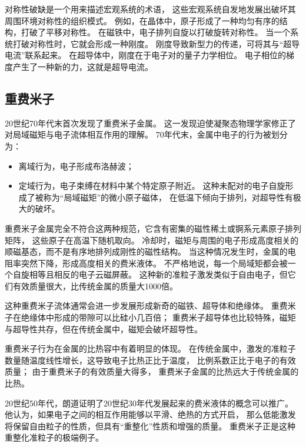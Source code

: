 \documentclass{article}
\begin{document}
对称性破缺是一个用来描述宏观系统的术语，
这些宏观系统自发地发展出破坏其周围环境对称性的组织模式。
例如，在晶体中，原子形成了一种均匀有序的结构，打破了平移对称性。
在磁铁中，电子排列自旋以打破旋转对称性。
当一个系统打破对称性时，它就会形成一种刚度。
刚度导致新型力的传递，可将其与“超导电流”联系起来。
在超导体中，刚度在于电子对的量子力学相位。
电子相位的梯度产生了一种新的力，这就是超导电流。

\subsection{重费米子}

20世纪70年代末首次发现了重费米子金属。
这一发现迫使凝聚态物理学家修正了对局域磁矩与电子流体相互作用的理解。
70年代末，金属中电子的行为被划分为：
\begin{itemize}
    \item 离域行为，电子形成布洛赫波；
    \item 定域行为，电子束缚在材料中某个特定原子附近。
    这种未配对的电子自旋形成了被称为“局域磁矩”的微小原子磁体，
    在低温下倾向于排列，对超导性有极大的破坏。
\end{itemize}

重费米子金属完全不符合这两种规范，它含有密集的磁性稀土或锕系元素原子排列矩阵，
这些原子在高温下随机取向。
冷却时，磁矩与周围的电子形成高度相关的顺磁基态，而不是有序地排列成刚性的磁性结构。
当这种情况发生时，金属的电阻率突然下降，形成高度相关的费米液体。
不严格地说，每一个局域矩都会被一个自旋相等且相反的电子云磁屏蔽。
这种新的准粒子激发类似于自由电子，但它们有效质量很大，比传统金属的质量大1000倍。 

这种重费米子流体通常会进一步发展形成新奇的磁铁、超导体和绝缘体。
重费米子在绝缘体中形成的带隙可以比硅小几百倍；
重费米子超导体也比较特殊，磁矩与超导性共存，但在传统金属中，磁矩会破坏超导性。

重费米子行为在金属的比热容中有着明显的体现。
在传统金属中，激发的准粒子数量随温度线性增长，这导致电子比热正比于温度，
比例系数正比于电子的有效质量；
由于重费米子的有效质量大得多，
重费米子金属的比热远大于传统金属的比热。

20世纪50年代，朗道证明了20世纪30年代发展起来的费米液体的概念可以推广。
他认为，如果电子之间的相互作用能够以平滑、绝热的方式开启，
那么低能激发将保留自由粒子的性质，但具有“重整化”性质和增强的质量。
重费米子正是这种重整化准粒子的极端例子。 
\end{document}
